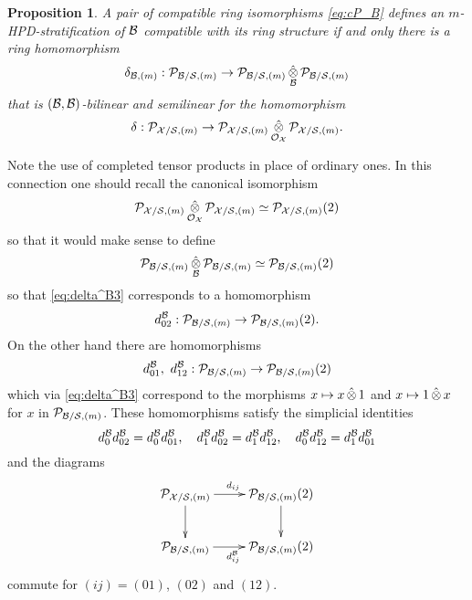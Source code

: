 \documentclass{article}
\theoremstyle{change}
\newtheorem{prop}[subsubsection]{Proposition}
\numberwithin{equation}{subsubsection}
\newcommand{\demobox}{\vrule height6pt width6pt depth0pt}
\newcommand{\nodemo}{\unskip\nobreak\hfil\qquad
\demobox\parfillskip=0pt\par}
\begin{document}
\begin{prop}\label{prop:m-HPD-stratified-algebra}
  A pair of compatible ring isomorphisms \ref{eq:cP_B} defines an
  $m$-HPD-stratification of ${\cal B}$ compatible with its ring structure
  if and only there is a ring homomorphism
  \begin{equation}
    \label{eq:delta^B3}
    \delta_{{\cal B},(m)}:{\cal P}_{{\cal B}/{\cal S},(m)}\to{\cal P}_{{\cal B}/{\cal S},(m)}
    \mathop{\hat\otimes}_{\cal B}{\cal P}_{{\cal B}/{\cal S},(m)}     
  \end{equation}
  that is $({\cal B},{\cal B})$-bilinear and semilinear for the homomorphism
  \begin{displaymath}
    \delta:{\cal P}_{{\cal X}/{\cal S},(m)}\to{\cal P}_{{\cal X}/{\cal S},(m)}\mathop{\hat\otimes}_{{\cal O}_{\cal X}}{\cal P}_{{\cal X}/{\cal S},(m)}.
  \end{displaymath}
  \nodemo
\end{prop}
Note the use of completed tensor products in place of ordinary ones.
In this connection one should recall the canonical
isomorphism
\begin{displaymath}
  {\cal P}_{{\cal X}/{\cal S},(m)}\mathop{\hat\otimes}_{{\cal O}_{\cal X}}{\cal P}_{{\cal X}/{\cal S},(m)}\simeq
  {\cal P}_{{\cal X}/{\cal S},(m)}(2)
\end{displaymath}
so that it would make sense to define
\begin{equation}
  \label{eq:P_B/S(2)}
  {\cal P}_{{\cal B}/{\cal S},(m)}\mathop{\hat\otimes}_{\cal B}{\cal P}_{{\cal B}/{\cal S},(m)}\simeq
  {\cal P}_{{\cal B}/{\cal S},(m)}(2)
\end{equation}
so that \ref{eq:delta^B3} corresponds to a homomorphism
\begin{equation}
  \label{eq:d_02^B}
  d^{\cal B}_{02}:{\cal P}_{{\cal B}/{\cal S},(m)}\to{\cal P}_{{\cal B}/{\cal S},(m)}(2).
\end{equation}
On the other hand there are homomorphisms
\begin{equation}
  \label{eq:d_01,12^B}
  d^\cB_{01},\ d^\cB_{12}:\cP_{\cB/\cS,(m)}\to\cP_{\cB/\cS,(m)}(2)
\end{equation}
which via \ref{eq:delta^B3} correspond to the morphisms
$x\mapsto x\mathop{\hat\otimes}1$ and $x\mapsto 1\mathop{\hat\otimes} x$ for $x$ in
${\cal P}_{{\cal B}/{\cal S},(m)}$. These homomorphisms satisfy the simplicial
identities
\begin{equation}
  \label{eq:d^B-simplicial-identities}
  d^{\cal B}_0d^{\cal B}_{02}=d^{\cal B}_0d^{\cal B}_{01},\quad
  d^{\cal B}_1d^{\cal B}_{02}=d^{\cal B}_1d^{\cal B}_{12},\quad
  d^{\cal B}_0d^{\cal B}_{12}=d^{\cal B}_1d^{\cal B}_{01}
\end{equation}
and the diagrams
\begin{equation}
  \label{eq:d^B-and-d}
  \xymatrix{
    \cP_{\cX/\cS,(m)}\ar[r]^{d_{ij}}\ar[d]
    &\cP_{\cB/\cS,(m)}(2)\ar[d]\\
    \cP_{\cB/\cS,(m)}\ar[r]_{d^\cB_{ij}}
    &\cP_{\cB/\cS,(m)}(2)\\
  }
\end{equation}
commute for $(ij)=(01)$, $(02)$ and $(12)$.
\end{document}
